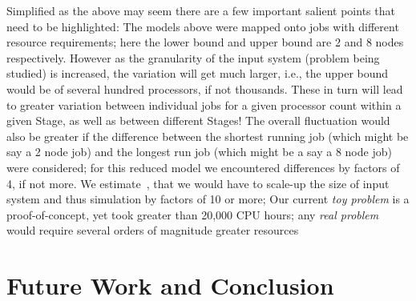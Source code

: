 \documentclass[conference,final]{IEEEtran}
\newcommand{\jha}[0]{}
\begin{document}

Simplified as the above may seem there are a few important salient
points that need to be highlighted: The models above were mapped onto
jobs with different resource requirements; here the lower bound and
upper bound are 2 and 8 nodes respectively. However as the granularity
of the input system (problem being studied) is increased, the
variation will get much larger, i.e., the upper bound would be of
several hundred processors, if not thousands. These in turn will lead
to greater variation between individual jobs for a given processor
count within a given Stage, as well as between different Stages!  The
overall fluctuation would also be greater if the difference between
the shortest running job (which might be say a 2 node job) and the
longest run job (which might be a say a 8 node job) were considered;
for this reduced model we encountered differences by factors of 4, if
not more.  We estimate~\cite{DO2007}, that we would have to scale-up
the size of input system and thus simulation by factors of 10 or more;
Our current {\it toy problem} is a proof-of-concept, yet took greater
than 20,000 CPU hours; any {\it real problem} would require several
orders of magnitude greater resources


\section{Future Work and Conclusion}
\end{document}
